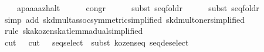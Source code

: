 \begin{isabellebody}
\ \ \ \ {}{}{}a{}{}p{}{}{}a{}{}a{}{}a{}{}a{}{}z{}{}halt{}{}\isanewline
\ \ \ \ \isamarkupfalse%
\ congr\isanewline
\ \ \ \ \isamarkupfalse%
\ {}subst\ seq{}foldr{}\isanewline
\ \ \ \ \isamarkupfalse%
\ {}subst\ seq{}foldr{}\ \isamarkupfalse%
\ \isamarkupfalse%
\isanewline
\ \ \ \ \isamarkupfalse%
\ {}simp\ add{}\ skd{}mult{}assoc{}symmetric{}simplified{}\ skd{}mult{}oner{}simplified{}{}\isanewline
\ \ \ \ \isamarkupfalse%
\ {}rule\ ska{}kozen{}skat{}lemma{}dual{}simplified{}{}\isanewline
\ \ \ \ \isamarkupfalse%
\ {}cut\ {}\ {}{}\ cut\ {}\ {}{}\ seq{}select\ {}{}\ subst\ kozen{}{}seq{}\ seq{}deselect{}\isanewline

\end{isabellebody}
